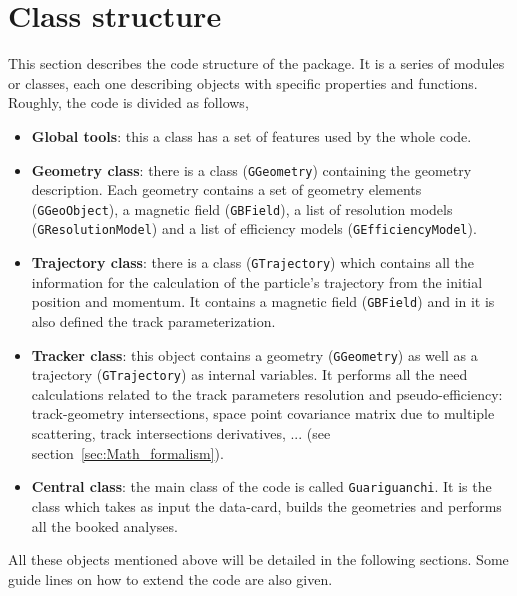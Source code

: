 \section{Class structure}
\label{sec:Class_structure}

This section describes the code structure of the {\guari} package. It is a series of modules or classes, each one 
describing objects with specific properties and functions. Roughly, the code is divided as follows,

\begin{itemize}
  \item  {\bf Global tools}: this a class has a set of features used by the whole code.
  
  \item  {\bf Geometry class}: there is a class ({\tt GGeometry}) containing the geometry description. Each 
  geometry contains a set of geometry elements ({\tt GGeoObject}), a magnetic field ({\tt GBField}), a list of 
  resolution models ({\tt GResolutionModel}) and a list of efficiency models ({\tt GEfficiencyModel}).
  
  \item  {\bf Trajectory class}: there is a class ({\tt GTrajectory}) which contains all the information for the calculation of the 
  particle's trajectory from the initial position and momentum. It contains a magnetic field ({\tt GBField}) and in it is also defined the 
  track parameterization.
  
  \item  {\bf Tracker class}: this object contains a geometry ({\tt GGeometry}) as well as a trajectory ({\tt GTrajectory}) as internal 
  variables. It performs all the need calculations related to the track parameters resolution and pseudo-efficiency: track-geometry 
  intersections, space point covariance matrix due to multiple scattering, track intersections derivatives, ... (see section~\ref{sec:Math_formalism}).
  
  \item  {\bf Central class}: the main class of the code is called {\tt Guariguanchi}. It is the class which takes as input the 
  data-card, builds the geometries and performs all the booked analyses.
  
\end{itemize}

All these objects mentioned above will be detailed in the following sections. Some guide lines on how to extend the code are also given.

